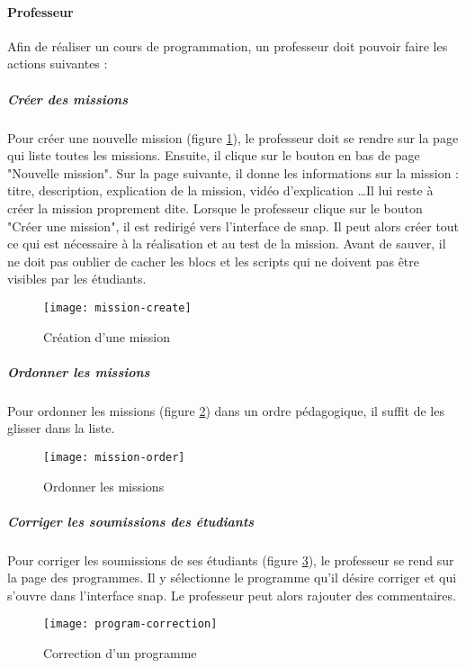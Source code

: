 \paragraph{Professeur}
Afin de réaliser un cours de programmation, un professeur doit pouvoir faire les actions suivantes :
\subparagraph{Créer des missions} Pour créer une nouvelle \gls{mission} (figure \ref{fig:mission-create}), le professeur doit se rendre sur la page qui liste toutes les \glspl{mission}. Ensuite, il clique sur le bouton en bas de page "Nouvelle mission". Sur la page suivante, il donne les informations sur la \gls{mission} : titre, description, explication de la mission, vidéo d'explication \ldots Il lui reste à créer la mission proprement dite. Lorsque le professeur clique sur le bouton "Créer une \gls{mission}", il est redirigé vers l'interface de \gls{snap}. Il peut alors créer tout ce qui est nécessaire à la réalisation et au test de la mission. Avant de sauver, il ne doit pas oublier de cacher les \glspl{bloc} et les \glspl{script} qui ne doivent pas être visibles par les étudiants.
\begin{figure}
  \begin{center}
    \texttt{[image: mission-create]}
    \caption{Création d'une mission}
    \label{fig:mission-create}
  \end{center}
\end{figure}

\subparagraph{Ordonner les missions} Pour ordonner les \glspl{mission} (figure \ref{fig:mission-order}) dans un ordre pédagogique, il suffit de les glisser dans la liste.
\begin{figure}
  \begin{center}
    \texttt{[image: mission-order]}
    \caption{Ordonner les missions}
    \label{fig:mission-order}
  \end{center}
\end{figure}

\subparagraph{Corriger les soumissions des étudiants} Pour corriger les soumissions de ses étudiants (figure \ref{fig:program-correction}), le professeur se rend sur la page des programmes. Il y sélectionne le programme qu'il désire corriger et qui s'ouvre dans l'interface \gls{snap}. Le professeur peut alors rajouter des commentaires.
\begin{figure}
  \begin{center}
    \texttt{[image: program-correction]}
    \caption{Correction d'un programme}
    \label{fig:program-correction}
  \end{center}
\end{figure}

